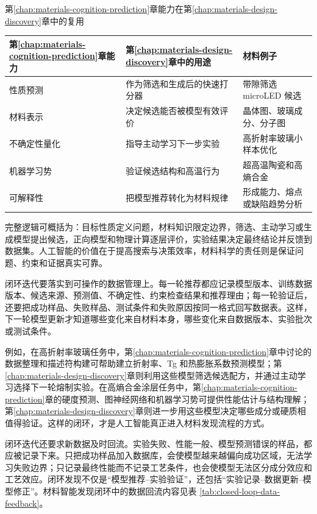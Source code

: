 \begin{formalTable}[htbp]
\caption{第\ref{chap:materials-cognition-prediction}章能力在第\ref{chap:materials-design-discovery}章中的复用}
\label{tab:chapter-one-capability-reuse}
\begin{tabularx}{\textwidth}{@{}YYY@{}}
\toprule
\textbf{第\ref{chap:materials-cognition-prediction}章能力} & \textbf{第\ref{chap:materials-design-discovery}章中的用途} & \textbf{材料例子} \\
\midrule
性质预测 & 作为筛选和生成后的快速打分器 & 带隙筛选 microLED 候选 \\
材料表示 & 决定候选能否被模型有效评价 & 晶体图、玻璃成分、分子图 \\
不确定性量化 & 指导主动学习下一步实验 & 高折射率玻璃小样本优化 \\
机器学习势 & 验证候选结构和高温行为 & 超高温陶瓷和高熵合金 \\
可解释性 & 把模型推荐转化为材料规律 & 形成能力、熔点或缺陷趋势分析 \\
\bottomrule
\end{tabularx}
\end{formalTable}

完整逻辑可概括为：目标性质定义问题，材料知识限定边界，筛选、主动学习或生成模型提出候选，正向模型和物理计算逐层评价，实验结果决定最终结论并反馈到数据集。人工智能的价值在于提高搜索与决策效率，材料科学的责任则是保证问题、约束和证据真实可靠。

闭环迭代要落实到可操作的数据管理上。每一轮推荐都应记录模型版本、训练数据版本、候选来源、预测值、不确定性、约束检查结果和推荐理由；每一轮验证后，还要把成功样品、失败样品、测试条件和失败原因按同一格式回写数据表。这样，下一轮模型更新才知道哪些变化来自材料本身，哪些变化来自数据版本、实验批次或测试条件。

例如，在高折射率玻璃任务中，第\ref{chap:materials-cognition-prediction}章中讨论的数据整理和描述符构建可帮助建立折射率、Tg 和热膨胀系数预测模型；第\ref{chap:materials-design-discovery}章则利用这些模型筛选候选配方，并通过主动学习选择下一轮熔制实验。在高熵合金涂层任务中，第\ref{chap:materials-cognition-prediction}章的硬度预测、图神经网络和机器学习势可提供性能估计与结构理解；第\ref{chap:materials-design-discovery}章则进一步用这些模型决定哪些成分或硬质相值得验证。这样的闭环，才是人工智能真正进入材料发现流程的方式。

闭环迭代还要求新数据及时回流。实验失败、性能一般、模型预测错误的样品，都应被记录下来。只把成功样品加入数据库，会使模型越来越偏向成功区域，无法学习失败边界；只记录最终性能而不记录工艺条件，也会使模型无法区分成分效应和工艺效应。闭环发现不仅是“模型推荐--实验验证”，还包括“实验记录--数据更新--模型修正”。材料智能发现闭环中的数据回流内容见表 \ref{tab:closed-loop-data-feedback}。

